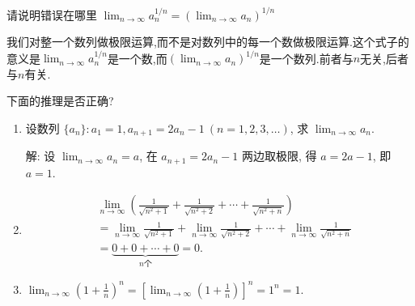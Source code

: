 \begin{example}
    请说明错误在哪里
    $
        \lim_{n \to \infty} a_n^{1/n} = \left(\lim_{n \to \infty} a_n\right)^{1/n}
    $

    \begin{solution}
        我们对整一个数列做极限运算,而不是对数列中的每一个数做极限运算.这个式子的意义是$\lim_{n \to \infty} a_n^{1/n}$是一个数,而$\left(\lim_{n \to \infty} a_n\right)^{1/n}$是一个数列.前者与$n$无关,后者与$n$有关.
    \end{solution}
\end{example}

\begin{exercise}[1.2.12]
    下面的推理是否正确?
    \begin{enumerate}
        \item 设数列 $\{a_n\}: a_1 = 1, a_{n+1} = 2a_n - 1 \ (n=1, 2, 3, \ldots)$, 求 $\lim_{n\to\infty} a_n$.
              \par\noindent 解: 设 $\lim_{n\to\infty} a_n = a$, 在 $a_{n+1} = 2a_n - 1$ 两边取极限, 得 $a = 2a - 1$, 即 $a = 1$.

        \item
              \begin{align*}
                   & \lim_{n\to\infty} \left( \frac{1}{\sqrt{n^2+1}} + \frac{1}{\sqrt{n^2+2}} + \cdots + \frac{1}{\sqrt{n^2+n}} \right)                        \\
                   & = \lim_{n\to\infty} \frac{1}{\sqrt{n^2+1}} + \lim_{n\to\infty} \frac{1}{\sqrt{n^2+2}} + \cdots + \lim_{n\to\infty} \frac{1}{\sqrt{n^2+n}} \\
                   & = \underbrace{0 + 0 + \cdots + 0}_{\text{$n$个}} = 0.
              \end{align*}

        \item $\lim_{n\to\infty} \left(1 + \frac{1}{n}\right)^n = \left[\lim_{n\to\infty} \left(1 + \frac{1}{n}\right)\right]^n = 1^n = 1$.
    \end{enumerate}
\end{exercise}

